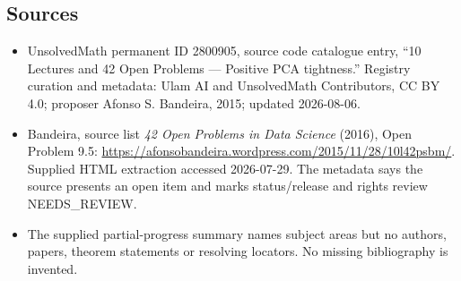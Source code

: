 \documentclass[11pt]{article}
\begin{document}
\subsection{Sources}
\begin{itemize}
\item UnsolvedMath permanent ID 2800905, source code catalogue entry, ``10 Lectures and 42 Open Problems --- Positive PCA tightness.'' Registry curation and metadata: Ulam AI and UnsolvedMath Contributors, CC BY 4.0; proposer Afonso S. Bandeira, 2015; updated 2026-08-06.
\item Bandeira, source list \emph{42 Open Problems in Data Science} (2016), Open Problem 9.5: \url{https://afonsobandeira.wordpress.com/2015/11/28/10l42psbm/}. Supplied HTML extraction accessed 2026-07-29. The metadata says the source presents an open item and marks status/release and rights review NEEDS\_REVIEW.
\item The supplied partial-progress summary names subject areas but no authors, papers, theorem statements or resolving locators. No missing bibliography is invented.
\end{itemize}
\end{document}
